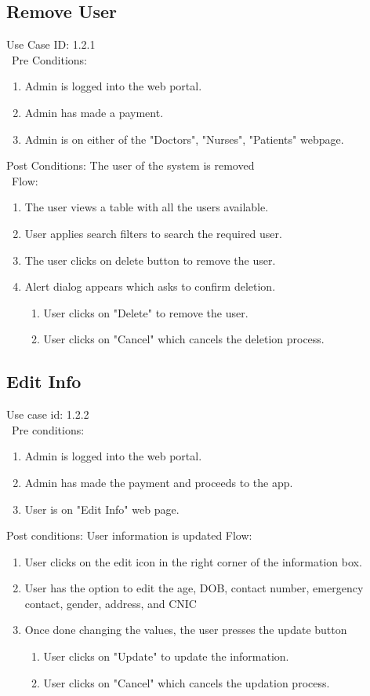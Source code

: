 \subsection{Remove User} 
Use Case ID: 1.2.1\\\
Pre Conditions:
\begin{enumerate}
    \item Admin is logged into the web portal. 
    \item Admin has made a payment.
    \item Admin is on either of the "Doctors", "Nurses", "Patients" webpage.
\end{enumerate}
Post Conditions: The user of the system is removed \\\
Flow: 
\begin{enumerate}
    \item The user views a table with all the users available. 
    \item  User applies search filters to search the required user. 
    \item The user clicks on delete button to remove the user. 
    \item Alert dialog appears which asks to confirm deletion.
    \begin{enumerate}
        \item User clicks on "Delete" to remove the user.
        \item User clicks on "Cancel" which cancels the deletion process.
    \end{enumerate}
\end{enumerate}
\subsection{Edit Info} 
Use case id: 1.2.2\\\
Pre conditions:
\begin{enumerate}
    \item Admin is logged into the web portal. 
    \item Admin has made the payment and proceeds to the app.
    \item User is on "Edit Info" web page.
\end{enumerate}
Post conditions: User information is updated
Flow: 
\begin{enumerate}
    \item User clicks on the edit icon in the right corner of the information box.
    \item User has the option to edit the age, DOB, contact number, emergency contact, gender, address, and CNIC
    \item  Once done changing the values, the user presses the update button
    \begin{enumerate}
        \item User clicks on "Update" to update the information.
        \item User clicks on "Cancel" which cancels the updation process.
    \end{enumerate}
    
\end{enumerate}
